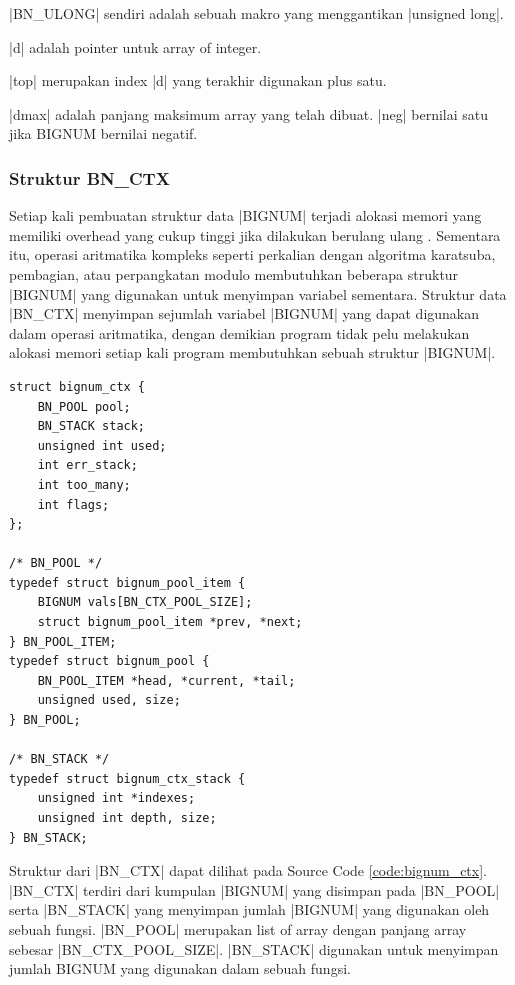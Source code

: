     |BN_ULONG| sendiri adalah sebuah makro yang menggantikan |unsigned long|.

    |d| adalah pointer untuk array of integer.

    |top| merupakan index |d| yang terakhir digunakan plus satu.

    |dmax| adalah panjang maksimum array yang telah dibuat. |neg| bernilai satu jika BIGNUM bernilai negatif.

    \subsubsection{Struktur BN\_CTX}

    Setiap kali pembuatan struktur data |BIGNUM| terjadi alokasi memori yang memiliki overhead yang cukup tinggi jika dilakukan berulang ulang \citep{doc_bnctx}. Sementara itu, operasi aritmatika kompleks seperti perkalian dengan algoritma karatsuba, pembagian, atau perpangkatan modulo membutuhkan beberapa struktur |BIGNUM| yang digunakan untuk menyimpan variabel sementara. Struktur data |BN_CTX| menyimpan sejumlah variabel |BIGNUM| yang dapat digunakan dalam operasi aritmatika, dengan demikian program tidak pelu melakukan alokasi memori setiap kali program membutuhkan sebuah struktur |BIGNUM|.


    \begin{lstlisting}[caption={Struktur bignum\_ctx}, label={code:bignum_ctx}]
struct bignum_ctx {
    BN_POOL pool;
    BN_STACK stack;
    unsigned int used;
    int err_stack;
    int too_many;
    int flags;
};

/* BN_POOL */
typedef struct bignum_pool_item {
    BIGNUM vals[BN_CTX_POOL_SIZE];
    struct bignum_pool_item *prev, *next;
} BN_POOL_ITEM;
typedef struct bignum_pool {
    BN_POOL_ITEM *head, *current, *tail;
    unsigned used, size;
} BN_POOL;

/* BN_STACK */
typedef struct bignum_ctx_stack {
    unsigned int *indexes;
    unsigned int depth, size;
} BN_STACK;
    \end{lstlisting}

    Struktur dari |BN_CTX| dapat dilihat pada Source Code \ref{code:bignum_ctx}. |BN_CTX| terdiri dari kumpulan |BIGNUM| yang disimpan pada |BN_POOL| serta |BN_STACK| yang menyimpan jumlah |BIGNUM| yang digunakan oleh sebuah fungsi. |BN_POOL| merupakan list of array dengan panjang array sebesar |BN_CTX_POOL_SIZE|. |BN_STACK| digunakan untuk menyimpan jumlah BIGNUM yang digunakan dalam sebuah fungsi.

